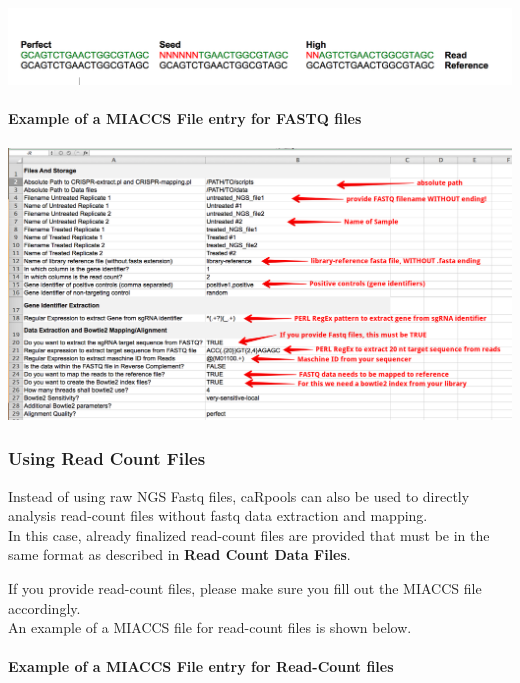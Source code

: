 \documentclass[]{article}
\let\oldparagraph\paragraph
\renewcommand{\paragraph}[1]{\oldparagraph{#1}\mbox{}}
\begin{document}
\includegraphics{./pictures/alignment-match.png}

\paragraph{Example of a MIACCS File entry for FASTQ
files}\label{example-of-a-miaccs-file-entry-for-fastq-files}

\includegraphics{./pictures/miaccs-fastq.png}

\subsubsection{Using Read Count Files}\label{using-read-count-files}

Instead of using raw NGS Fastq files, caRpools can also be used to
directly analysis read-count files without fastq data extraction and
mapping.\\
In this case, already finalized read-count files are provided that must
be in the same format as described in \textbf{Read Count Data Files}.

If you provide read-count files, please make sure you fill out the
MIACCS file accordingly.\\
An example of a MIACCS file for read-count files is shown below.

\paragraph{Example of a MIACCS File entry for Read-Count
files}\label{example-of-a-miaccs-file-entry-for-read-count-files}
\end{document}
